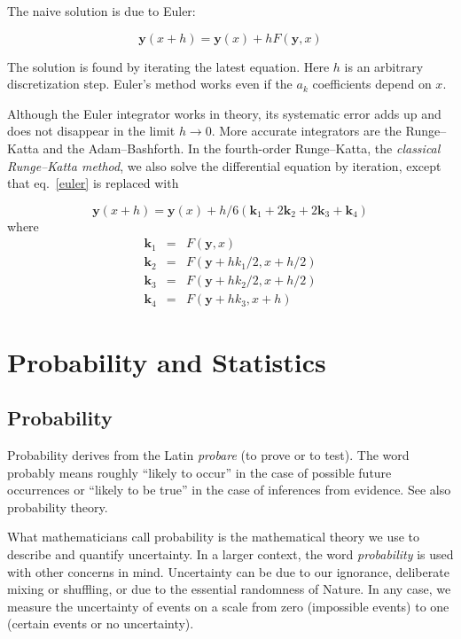 \documentclass[justified,sixbynine]{tufte-book}
\theoremstyle{plain}%
\theoremstyle{definition}
\theoremstyle{remark}
\begin{document}
\begin{fullwidth}
The naive solution is due to Euler:

\begin{equation}
\mathbf{y}(x+h) = \mathbf{y}(x) + hF(\mathbf{y},x)\label{euler}
\end{equation}

The solution is found by iterating the latest equation. Here $h$ is an arbitrary discretization step. Euler's method works even if the $a_k$ coefficients depend on $x$.

 Although the Euler integrator works in theory, its systematic error adds up and does not disappear in the limit $h\rightarrow 0$. More accurate integrators are the Runge--Katta and the Adam--Bashforth. In the fourth-order Runge--Katta, the {\it classical Runge--Katta method}, we also solve the differential equation by iteration, except that eq.~\ref{euler} is replaced with

\begin{equation}
\mathbf{y}(x+h) = \mathbf{y}(x) + h/6 (\mathbf{k}_1+2\mathbf{k}_2+2\mathbf{k}_3+\mathbf{k}_4)\label{rungekatta}
\end{equation}
where
\begin{eqnarray}
\mathbf{k}_1 &=& F(\mathbf{y},x) \\
\mathbf{k}_2 &=& F(\mathbf{y}+h k_1/2,x+h/2) \\
\mathbf{k}_3 &=& F(\mathbf{y}+h k_2/2,x+h/2) \\
\mathbf{k}_4 &=& F(\mathbf{y}+h k_3,x+h)
\end{eqnarray}

\chapter{Probability and Statistics}

\goodbreak\section{Probability}


Probability derives from the Latin {\it probare} (to prove or to test). The word
probably means roughly ``likely to occur'' in the case of possible future
occurrences or ``likely to be true'' in the case of inferences from
evidence. See also probability theory.

What mathematicians call probability is the mathematical theory we use to
describe and quantify uncertainty. In a larger context, the word {\it probability}
is used with other concerns in mind. Uncertainty can be due to our
ignorance, deliberate mixing or shuffling, or due to the essential
randomness of Nature. In any case, we measure the uncertainty of events on a
scale from zero (impossible events) to one (certain events or no
uncertainty).


\end{fullwidth}
\end{document}
